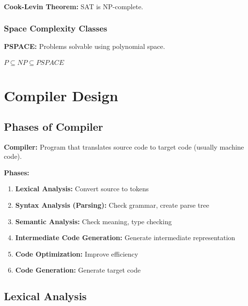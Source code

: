 \documentclass[11pt,a4paper]{article}
\begin{document}
\begin{thmbox}
\textbf{Cook-Levin Theorem:} SAT is NP-complete.
\end{thmbox}

\subsubsection{Space Complexity Classes}

\begin{defbox}
\textbf{PSPACE:} Problems solvable using polynomial space.
\end{defbox}

\begin{thmbox}
$P \subseteq NP \subseteq PSPACE$
\end{thmbox}

\section{Compiler Design}

\subsection{Phases of Compiler}

\begin{defbox}
\textbf{Compiler:} Program that translates source code to target code (usually machine code).
\end{defbox}

\textbf{Phases:}
\begin{enumerate}
    \item \textbf{Lexical Analysis:} Convert source to tokens
    \item \textbf{Syntax Analysis (Parsing):} Check grammar, create parse tree
    \item \textbf{Semantic Analysis:} Check meaning, type checking
    \item \textbf{Intermediate Code Generation:} Generate intermediate representation
    \item \textbf{Code Optimization:} Improve efficiency
    \item \textbf{Code Generation:} Generate target code
\end{enumerate}

\subsection{Lexical Analysis}
\end{document}
